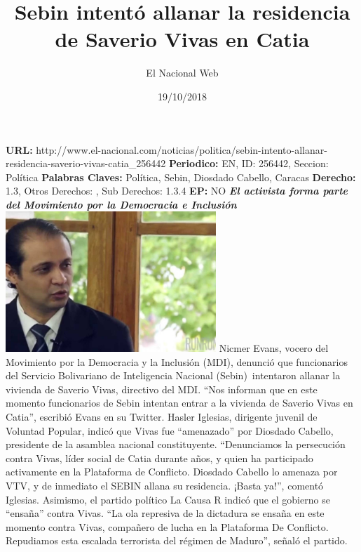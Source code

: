 \documentclass{article}%
\title{\textbf{Sebin intentó allanar la residencia de Saverio Vivas en Catia}}%
\author{El Nacional Web}%
\date{19/10/2018}%
\begin{document}
%
\normalsize%
\maketitle%
\textbf{URL: }%
http://www.el{-}nacional.com/noticias/politica/sebin{-}intento{-}allanar{-}residencia{-}saverio{-}vivas{-}catia\_256442\newline%
%
\textbf{Periodico: }%
EN, %
ID: %
256442, %
Seccion: %
Política\newline%
%
\textbf{Palabras Claves: }%
Política, Sebin, Diosdado Cabello, Caracas\newline%
%
\textbf{Derecho: }%
1.3, %
Otros Derechos: %
, %
Sub Derechos: %
1.3.4\newline%
%
\textbf{EP: }%
NO\newline%
\newline%
%
\textbf{\textit{El activista forma parte del Movimiento por la Democracia e Inclusión~}}%
\newline%
\newline%
%
\includegraphics[width=300px]{175.jpg}%
\newline%
%
Nicmer Evans, vocero del Movimiento por la Democracia y la Inclusión (MDI), denunció que funcionarios del Servicio Bolivariano de Inteligencia Nacional (Sebin)~intentaron allanar la vivienda de Saverio Vivas, directivo del MDI.%
\newline%
%
“Nos informan que en este momento funcionarios de Sebin intentan entrar a la vivienda de Saverio Vivas en Catia”, escribió Evans en su Twitter.%
\newline%
%
Hasler Iglesias, dirigente juvenil de Voluntad Popular, indicó que Vivas fue “amenazado” por Diosdado Cabello, presidente de la asamblea nacional constituyente.%
\newline%
%
“Denunciamos la persecución contra Vivas, líder social de Catia durante años, y quien ha participado activamente en la Plataforma de Conflicto. Diosdado Cabello lo amenaza por VTV, y de inmediato el SEBIN allana su residencia. ¡Basta ya!”, comentó Iglesias.%
\newline%
%
Asimismo, el partido político La Causa R indicó que el gobierno se “ensaña” contra Vivas.%
\newline%
%
“La ola represiva de la dictadura se ensaña en este momento contra Vivas, compañero de lucha en la Plataforma De Conflicto. Repudiamos esta escalada terrorista del régimen de Maduro”, señaló el partido.%
\newline%
%
\end{document}
